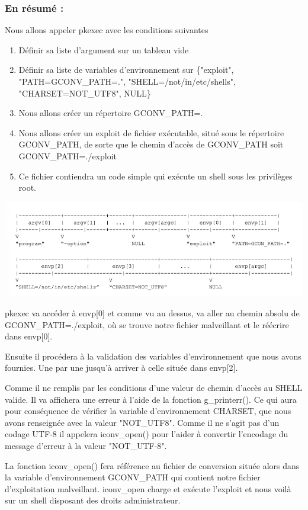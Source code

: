 \documentclass[12pt,a4paper]{article}
\begin{document}
\begin{flushleft}
            \subsubsection{En résumé : }
            \item Nous allons appeler pkexec avec les conditions suivantes
            \begin{enumerate}
                \item Définir sa liste d'argument sur un tableau vide
                \item Définir sa liste de variables d'environnement sur \{"exploit", "PATH=GCONV\_PATH=.", "SHELL=/not/in/etc/shells", "CHARSET=NOT\_UTF8", NULL\}
                \item Nous allons créer un répertoire GCONV\_PATH=.
                \item Nous allons créer un exploit de fichier exécutable, situé sous le répertoire GCONV\_PATH, de sorte que le chemin d'accès de GCONV\_PATH soit GCONV\_PATH=./exploit
                \item Ce fichier contiendra un code simple qui exécute un shell sous les privilèges root.
            \end{enumerate}
            \begin{center}
                    \includegraphics[scale=0.5]{pileappel} 
            \end{center}
            \item pkexec va accéder à envp[0] et comme vu au dessus, va aller au chemin absolu de GCONV\_PATH=./exploit, où se trouve notre fichier malveillant et le réécrire dans envp[0].
            \item Ensuite il procédera à la validation des variables d'environnement que nous avons fournies. Une par une jusqu'à arriver à celle située dans envp[2].
            \item Comme il ne remplis par les conditions d'une valeur de chemin d'accès au SHELL valide. Il va affichera une erreur à l'aide de la fonction g\_printerr(). Ce qui aura pour conséquence de vérifier la variable d'environnement CHARSET, que nous avons renseignée avec la valeur "NOT\_UTF8". Comme il ne s'agit pas d'un codage UTF-8 il appelera iconv\_open() pour l'aider à convertir l'encodage du message d'erreur à la valeur "NOT\_UTF-8".
            \item La fonction iconv\_open() fera référence au fichier de conversion située alors dans la variable d'environnement GCONV\_PATH qui contient notre fichier d'exploitation malveillant. iconv\_open charge et exécute l'exploit et nous voilà sur un shell disposant des droits administrateur.

    \end{flushleft}
       \newpage
\end{document}
